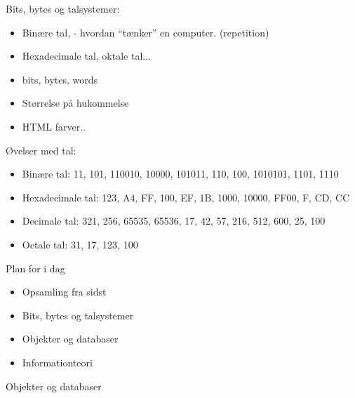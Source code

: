 \documentclass[a4paper,landscape]{slides}
\begin{document}
\begin{slide}
\begin{itemize}
\end{itemize} \end{slide} \begin{slide}\begin{center} {\large Bits, bytes og talsystemer:  } \end{center} \begin{itemize} \addtolength{\itemsep}{-\baselineskip}
    \item  Binære tal, - hvordan ``tænker'' en computer. (repetition)
    \item  Hexadecimale tal, oktale tal...
    \item  bits, bytes, words
    \item  Størrelse på hukommelse
    \item  HTML farver..
\end{itemize} \end{slide} \begin{slide}\begin{center} {\large Øvelser med tal: } \end{center} \begin{itemize} \addtolength{\itemsep}{-\baselineskip}
    \item  Binære tal: 11, 101, 110010, 10000, 101011, 110, 100, 1010101, 1101, 1110
    \item  Hexadecimale tal: 123, A4, FF, 100, EF, 1B, 1000, 10000, FF00, F, CD, CC   
    \item  Decimale tal: 321, 256, 65535, 65536, 17, 42, 57, 216, 512, 600, 25, 100
    \item  Octale tal: 31, 17, 123, 100
\end{itemize} \end{slide} \begin{slide}\begin{center} {\large Plan for i dag } \end{center} \begin{itemize} \addtolength{\itemsep}{-\baselineskip} \item  Opsamling fra sidst \item  Bits, bytes og talsystemer \item  Objekter og databaser \item  Informationteori
\end{itemize} \end{slide} \begin{slide}\begin{center} {\large Objekter og databaser } \end{center} \begin{itemize} \addtolength{\itemsep}{-\baselineskip}

\end{itemize}
\end{slide}
\end{document}
